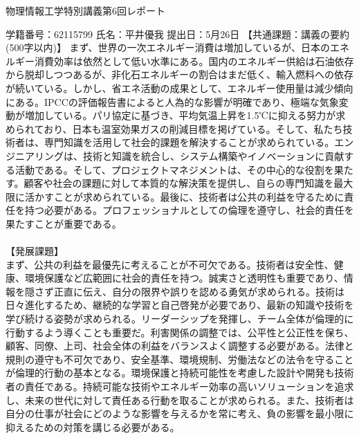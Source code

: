 \documentclass[a4paper,10.5pt]{ltjsarticle}
\begin{document}
\centerline
{\huge 物理情報工学特別講義第6回レポート}
\rightline
{学籍番号：62115799}
\rightline
{氏名：平井優我}
\rightline
{提出日：5月26日}
\rightline
{}
\leftline
{\large 【共通課題：講義の要約(500字以内)】}
まず、世界の一次エネルギー消費は増加しているが、日本のエネルギー消費効率は依然として低い水準にある。国内のエネルギー供給は石油依存から脱却しつつあるが、非化石エネルギーの割合はまだ低く、輸入燃料への依存が続いている。しかし、省エネ活動の成果として、エネルギー使用量は減少傾向にある。IPCCの評価報告書によると人為的な影響が明確であり、極端な気象変動が増加している。パリ協定に基づき、平均気温上昇を1.5℃に抑える努力が求められており、日本も温室効果ガスの削減目標を掲げている。そして、私たち技術者は、専門知識を活用して社会的課題を解決することが求められている。エンジニアリングは、技術と知識を統合し、システム構築やイノベーションに貢献する活動である。そして、プロジェクトマネジメントは、その中心的な役割を果たす。顧客や社会の課題に対して本質的な解決策を提供し、自らの専門知識を最大限に活かすことが求められている。最後に、技術者は公共の利益を守るために責任を持つ必要がある。プロフェッショナルとしての倫理を遵守し、社会的責任を果たすことが重要である。\\
\\
\leftline
{\large 【発展課題】}\\
まず、公共の利益を最優先に考えることが不可欠である。技術者は安全性、健康、環境保護など広範囲に社会的責任を持つ。誠実さと透明性も重要であり、情報を隠さず正直に伝え、自分の限界や誤りを認める勇気が求められる。技術は日々進化するため、継続的な学習と自己啓発が必要であり、最新の知識や技術を学び続ける姿勢が求められる。リーダーシップを発揮し、チーム全体が倫理的に行動するよう導くことも重要だ。利害関係の調整では、公平性と公正性を保ち、顧客、同僚、上司、社会全体の利益をバランスよく調整する必要がある。法律と規則の遵守も不可欠であり、安全基準、環境規制、労働法などの法令を守ることが倫理的行動の基本となる。環境保護と持続可能性を考慮した設計や開発も技術者の責任である。持続可能な技術やエネルギー効率の高いソリューションを追求し、未来の世代に対して責任ある行動を取ることが求められる。また、技術者は自分の仕事が社会にどのような影響を与えるかを常に考え、負の影響を最小限に抑えるための対策を講じる必要がある。
\end{document}
